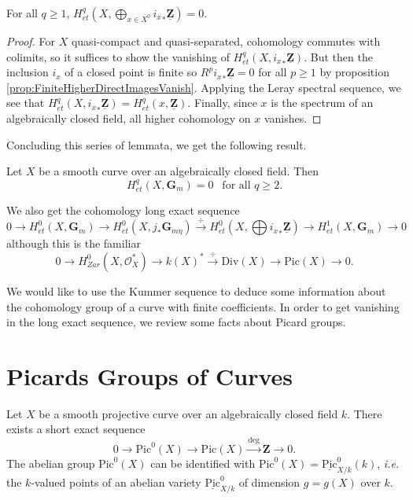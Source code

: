 \begin{lemma}
For all $q \geq 1$, $H_{et}^q(X, \bigoplus_{x \in X^0} {i_x}_* 
\underline{\mathbf{Z}}) = 0$.
\end{lemma}

\begin{proof}
For $X$ quasi-compact and quasi-separated, cohomology commutes with colimits, 
so it suffices to show the vanishing of $H_{et}^q(X, {i_x}_* 
\underline{\mathbf{Z}})$. But then the inclusion $i_x$ of a closed point is 
finite so $R^p {i_x}_* \underline{\mathbf{Z}} = 0$ for all $p \geq 1$ by 
proposition \ref{prop:FiniteHigherDirectImagesVanish}. Applying the Leray 
spectral sequence, we see that $H_{et}^q(X, {i_x}_* \underline{\mathbf{Z}}) = 
H_{et}^q(x, \underline{\mathbf{Z}})$. Finally, since $x$ is the spectrum of an 
algebraically closed field, all higher cohomology on $x$ vanishes.
\end{proof}

\noindent
Concluding this series of lemmata, we get the following result.

\begin{theorem}
Let $X$ be a smooth curve over an algebraically closed field. Then 
$$
H_{et}^q(X, \mathbf{G}_m) = 0 \ \ \text{ for all } q \geq 2.
$$
\end{theorem}

\noindent
We also get the cohomology long exact sequence
$$
0 \to H_{et}^0(X,\mathbf{G}_m) \to H_{et}^0(X,j_*\mathbf{G}_{m\eta}) 
\xrightarrow{\div} H_{et}^0(X,\bigoplus {i_x}_*\underline{\mathbf{Z}}) \to 
H_{et}^1(X,\mathbf{G}_m) \to 0
$$
although this is the familiar
$$
0 \to H_{Zar}^0(X,\mathcal{O}_X^*) \to k(X)^* \xrightarrow{\div} \text{Div}(X) 
\to \text{Pic}(X) \to 0.
$$

\medskip\noindent
We would like to use the Kummer sequence to deduce some information about the 
cohomology group of a curve with finite coefficients. In order to get vanishing 
in the long exact sequence, we review some facts about Picard groups.

\section{Picards Groups of Curves}
\label{section-pic-curves}

\noindent
Let $X$ be a smooth projective curve over an algebraically closed field $k$. 
There exists a short exact sequence
$$
0\to \text{Pic}^0(X) \to  \text{Pic}(X)\xrightarrow{\deg} \mathbf{Z} \to 0.
$$
The abelian group $\text{Pic}^0(X)$ can be identified with $\text{Pic}^0(X) = 
\underline{\text{Pic}}^0_{X/k}(k)$, {\it i.e.} the $k$-valued points of an 
abelian variety $\underline{\text{Pic}}^0_{X/k}$ of dimension $g=g(X)$ over 
$k$. 

